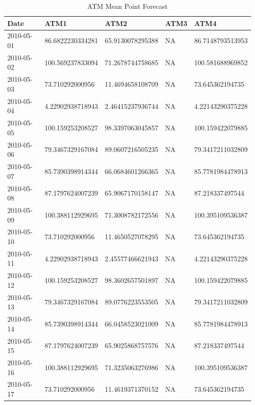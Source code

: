 \documentclass[openany]{book}
\begin{document}
\begin{table}[H]

\caption{\label{tab:unnamed-chunk-11}ATM Mean Point Forecast}
\centering
\begin{tabular}{l|l|l|l|l}
\hline
\textbf{Date} & \textbf{ATM1} & \textbf{ATM2} & \textbf{ATM3} & \textbf{ATM4}\\
\hline
\rowcolor{gray!6}  2010-05-01 & 86.6822230334281 & 65.9130078295388 & NA & 86.7148793513953\\
\hline
2010-05-02 & 100.569237833094 & 71.2678744758685 & NA & 100.581688969852\\
\hline
\rowcolor{gray!6}  2010-05-03 & 73.710292000956 & 11.4694658108709 & NA & 73.645362194735\\
\hline
2010-05-04 & 4.22902938718943 & 2.46415237936744 & NA & 4.22143290375228\\
\hline
\rowcolor{gray!6}  2010-05-05 & 100.159253208527 & 98.3397063045857 & NA & 100.159422079885\\
\hline
2010-05-06 & 79.3467329167084 & 89.0607216505235 & NA & 79.3417211032809\\
\hline
\rowcolor{gray!6}  2010-05-07 & 85.7390398914344 & 66.0684601266365 & NA & 85.7781984478913\\
\hline
2010-05-08 & 87.1797624007239 & 65.9067170158147 & NA & 87.218337497544\\
\hline
\rowcolor{gray!6}  2010-05-09 & 100.388112929695 & 71.3008782172556 & NA & 100.395109536387\\
\hline
2010-05-10 & 73.710292000956 & 11.4650527078295 & NA & 73.645362194735\\
\hline
\rowcolor{gray!6}  2010-05-11 & 4.22902938718943 & 2.45577466621943 & NA & 4.22143290375228\\
\hline
2010-05-12 & 100.159253208527 & 98.3602657501897 & NA & 100.159422079885\\
\hline
\rowcolor{gray!6}  2010-05-13 & 79.3467329167084 & 89.0776223553505 & NA & 79.3417211032809\\
\hline
2010-05-14 & 85.7390398914344 & 66.0458523021009 & NA & 85.7781984478913\\
\hline
\rowcolor{gray!6}  2010-05-15 & 87.1797624007239 & 65.9025868757576 & NA & 87.218337497544\\
\hline
2010-05-16 & 100.388112929695 & 71.3235063276986 & NA & 100.395109536387\\
\hline
\rowcolor{gray!6}  2010-05-17 & 73.710292000956 & 11.4619371370152 & NA & 73.645362194735\\

\end{tabular}
\end{table}
\end{document}
